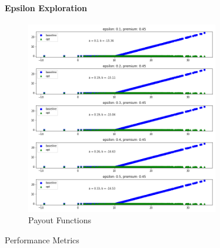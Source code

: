 \documentclass[11pt]{article}
\begin{document}
            \paragraph*{Epsilon Exploration}
                \begin{figure}[H]
                    \centering
                    \caption{Payout Functions}
                    \includegraphics[width=0.75\textwidth]{../../output/figures/CVaR/epsilon_exploration_full.png}
                \end{figure}

                \begin{table}[H]
                    \centering
                    \caption{Performance Metrics}
                    
                \end{table}

                \FloatBarrier
\end{document}
